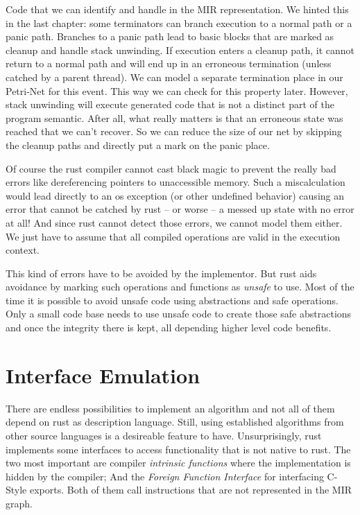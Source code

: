 Code that we can identify and handle in the MIR representation.
We hinted this in the last chapter: some terminators can branch execution to a normal path or a panic path.
Branches to a panic path lead to basic blocks that are marked as cleanup and handle stack unwinding.
If execution enters a cleanup path, it cannot return to a normal path and will end up in an erroneous termination (unless catched by a parent thread).
We can model a separate termination place in our Petri-Net for this event.
This way we can check for this property later.
However, stack unwinding will execute generated code that is not a distinct part of the program semantic.
After all, what really matters is that an erroneous state was reached that we can't recover.
So we can reduce the size of our net by skipping the cleanup paths and directly put a mark on the panic place.

Of course the rust compiler cannot cast black magic to prevent the really bad errors like dereferencing pointers to unaccessible memory.
Such a miscalculation would lead directly to an os exception (or other undefined behavior) causing an error that cannot be catched by rust -- or worse -- a messed up state with no error at all!
And since rust cannot detect those errors, we cannot model them either.
We just have to assume that all compiled operations are valid in the execution context.

This kind of errors have to be avoided by the implementor.
But rust aids avoidance by marking such operations and functions as \textit{unsafe} to use.
Most of the time it is possible to avoid unsafe code using abstractions and safe operations.
Only a small code base needs to use unsafe code to create those safe abstractions and once the integrity there is kept, all depending higher level code benefits.


\section{Interface Emulation}
There are endless possibilities to implement an algorithm and not all of them depend on rust as description language.
Still, using established algorithms from other source languages is a desireable feature to have.
Unsurprisingly, rust implements some interfaces to access functionality that is not native to rust.
The two most important are compiler \textit{intrinsic functions} where the implementation is hidden by the compiler;
And the \textit{Foreign Function Interface} for interfacing C-Style exports.
Both of them call instructions that are not represented in the MIR graph.

